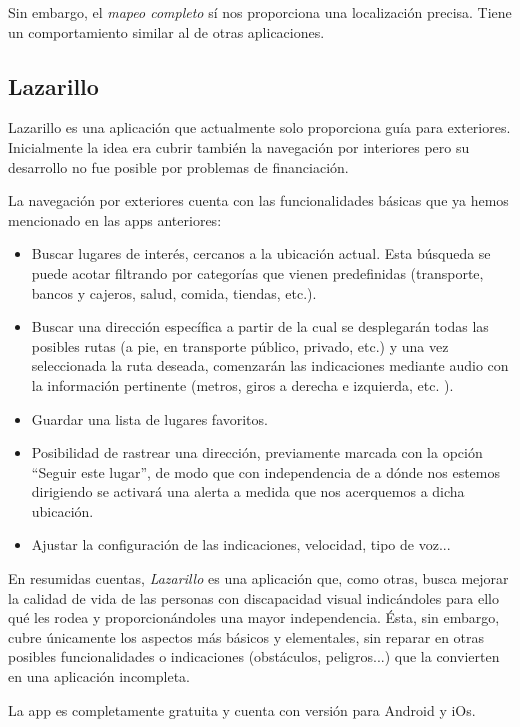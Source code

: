Sin embargo, el \textit{mapeo completo} sí nos proporciona una localización precisa. Tiene un comportamiento similar al de otras aplicaciones.


\subsection{Lazarillo}
Lazarillo \citep{lazarilloOnline} es una aplicación que actualmente solo proporciona guía para exteriores. Inicialmente la idea era cubrir también la navegación por interiores pero su desarrollo no fue posible por problemas de financiación.

La navegación por exteriores cuenta con las funcionalidades básicas que ya hemos mencionado en las apps anteriores: \begin{itemize}
	\item Buscar lugares de interés, cercanos a la ubicación actual. Esta búsqueda se puede acotar filtrando por categorías que vienen predefinidas (transporte, bancos y cajeros, salud, comida, tiendas, etc.).
	\item Buscar una dirección específica a partir de la cual se desplegarán todas las posibles rutas (a pie, en transporte público, privado, etc.) y una vez seleccionada la ruta deseada, comenzarán las indicaciones mediante audio con la información pertinente (metros, giros a derecha e izquierda, etc. ). 
	\item Guardar una lista de lugares favoritos.
	\item Posibilidad de rastrear una dirección, previamente marcada con la opción ``Seguir este lugar'', de modo que con independencia de a dónde nos estemos dirigiendo se activará una alerta a medida que nos acerquemos a dicha ubicación.
	\item Ajustar la configuración de las indicaciones, velocidad, tipo de voz...
\end{itemize}

En resumidas cuentas, \textit{Lazarillo} es una aplicación que, como otras, busca mejorar la calidad de vida de las personas con discapacidad visual indicándoles para ello qué les rodea y proporcionándoles una mayor independencia. Ésta, sin embargo, cubre únicamente los aspectos más básicos y elementales, sin reparar en otras posibles funcionalidades o indicaciones (obstáculos, peligros...) que la convierten en una aplicación incompleta.

La app es completamente gratuita y cuenta con versión para Android y iOs.
